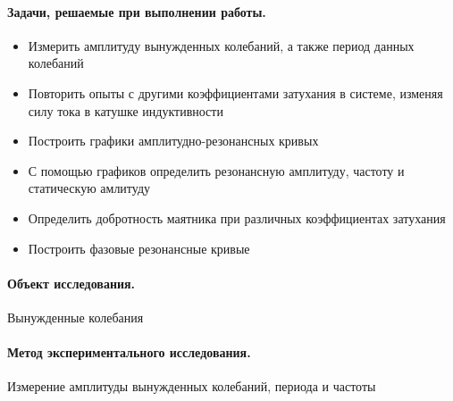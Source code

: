 \documentclass[a4paper]{article}
\begin{document}
		\paragraph{Задачи, решаемые при выполнении работы.} 
		\begin{itemize}
			\item Измерить амплитуду вынужденных колебаний, а также период данных колебаний
			\item Повторить опыты с другими коэффициентами затухания в системе, изменяя силу тока в катушке индуктивности
			\item Построить графики амплитудно-резонансных кривых
			\item С помощью графиков определить резонансную амплитуду, частоту и статическую амлитуду
			\item Определить добротность маятника при различных коэффициентах затухания
			\item Построить фазовые резонансные кривые
		\end{itemize}
		
		\paragraph{Объект исследования.} Вынужденные колебания
		
		\paragraph{Метод экспериментального исследования.}
		Измерение амплитуды вынужденных колебаний, периода и частоты
		
\end{document}
